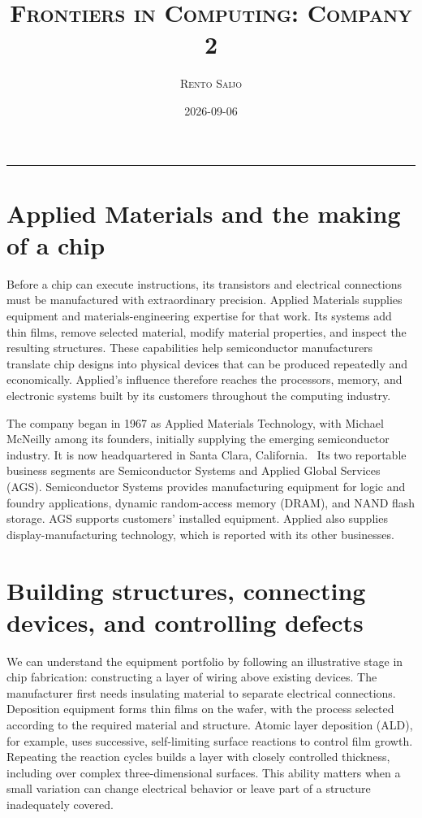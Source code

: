 \documentclass[10pt]{article}
\title{\Large\textsc{Frontiers in Computing: Company 2}}
\author{\large\textsc{Rento Saijo}}
\date{2026-09-06}
\begin{document}
\maketitle
\thispagestyle{fancy}
\vspace{-1em}\rule{\linewidth}{0.6pt}\vspace{0.5em}

\section*{Applied Materials and the making of a chip}

Before a chip can execute instructions, its transistors and electrical connections must be manufactured with extraordinary precision. Applied Materials supplies equipment and materials-engineering expertise for that work. Its systems add thin films, remove selected material, modify material properties, and inspect the resulting structures. These capabilities help semiconductor manufacturers translate chip designs into physical devices that can be produced repeatedly and economically. Applied's influence therefore reaches the processors, memory, and electronic systems built by its customers throughout the computing industry.~\cite{amat-products}

The company began in 1967 as Applied Materials Technology, with Michael McNeilly among its founders, initially supplying the emerging semiconductor industry. It is now headquartered in Santa Clara, California.~\cite{amat-history,amat-annual} Its two reportable business segments are Semiconductor Systems and Applied Global Services (AGS). Semiconductor Systems provides manufacturing equipment for logic and foundry applications, dynamic random-access memory (DRAM), and NAND flash storage. AGS supports customers' installed equipment. Applied also supplies display-manufacturing technology, which is reported with its other businesses.~\cite{amat-annual}

\section*{Building structures, connecting devices, and controlling defects}

We can understand the equipment portfolio by following an illustrative stage in chip fabrication: constructing a layer of wiring above existing devices. The manufacturer first needs insulating material to separate electrical connections. Deposition equipment forms thin films on the wafer, with the process selected according to the required material and structure. Atomic layer deposition (ALD), for example, uses successive, self-limiting surface reactions to control film growth. Repeating the reaction cycles builds a layer with closely controlled thickness, including over complex three-dimensional surfaces. This ability matters when a small variation can change electrical behavior or leave part of a structure inadequately covered.~\cite{amat-processes}
\end{document}
